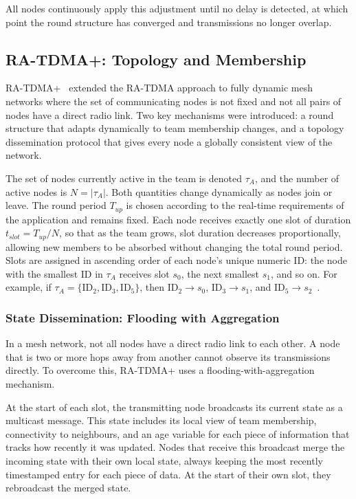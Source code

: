 All nodes continuously apply this adjustment until no delay is detected,
at which point the round structure has converged and transmissions no
longer overlap.

\subsection{RA-TDMA+: Topology and Membership}
\label{sec:ratdma-plus}

RA-TDMA+~\cite{oliveira2018clockless} extended the RA-TDMA approach to
fully dynamic mesh networks where the set of communicating nodes is not
fixed and not all pairs of nodes have a direct radio link. Two key
mechanisms were introduced: a round structure that adapts dynamically
to team membership changes, and a topology dissemination protocol that
gives every node a globally consistent view of the network.

The set of nodes currently active in the team is denoted $\tau_A$, and
the number of active nodes is $N = |\tau_A|$. Both quantities change
dynamically as nodes join or leave. The round period $T_{up}$ is
chosen according to the real-time requirements of the application and
remains fixed. Each node receives exactly one slot of duration
$t_{slot} = T_{up} / N$, so that as the team grows, slot duration
decreases proportionally, allowing new members to be absorbed without
changing the total round period. Slots are assigned in ascending order
of each node's unique numeric ID: the node with the smallest ID in
$\tau_A$ receives slot $s_0$, the next smallest $s_1$, and so on. For
example, if $\tau_A = \{\text{ID}_2, \text{ID}_3, \text{ID}_5\}$,
then $\text{ID}_2 \to s_0$, $\text{ID}_3 \to s_1$, and
$\text{ID}_5 \to s_2$~\cite{oliveira2018clockless}.

\subsubsection{State Dissemination: Flooding with Aggregation}

In a mesh network, not all nodes have a direct radio link to each
other. A node that is two or more hops away from another cannot
observe its transmissions directly. To overcome this, RA-TDMA+ uses a
flooding-with-aggregation mechanism.

At the start of each slot, the transmitting node broadcasts its current
state as a multicast message. This state includes its local view of
team membership, connectivity to neighbours, and an age variable for
each piece of information that tracks how recently it was updated.
Nodes that receive this broadcast merge the incoming state with their
own local state, always keeping the most recently timestamped entry for
each piece of data. At the start of their own slot, they rebroadcast
the merged state.

